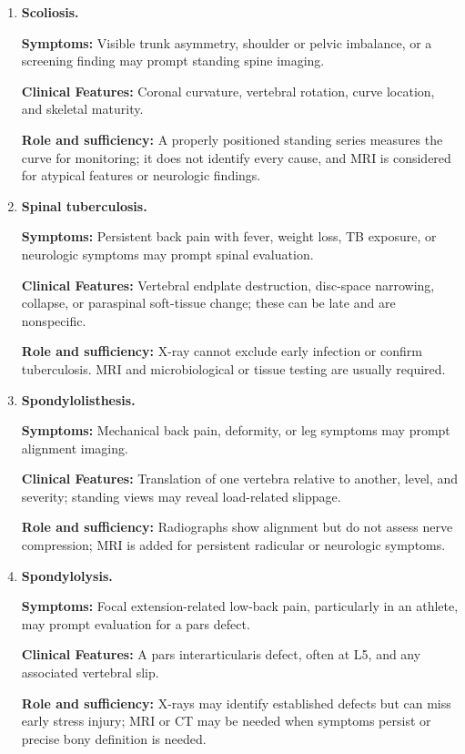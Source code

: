 \begin{enumerate}[leftmargin=*,itemsep=0.45em,topsep=0.4em]
\item \textbf{Scoliosis.}\par\noindent\textbf{Symptoms:} Visible trunk asymmetry, shoulder or pelvic imbalance, or a screening finding may prompt standing spine imaging.\par\noindent\textbf{Clinical Features:} Coronal curvature, vertebral rotation, curve location, and skeletal maturity.\par\noindent\textbf{Role and sufficiency:} A properly positioned standing series measures the curve for monitoring; it does not identify every cause, and MRI is considered for atypical features or neurologic findings.
\item \textbf{Spinal tuberculosis.}\par\noindent\textbf{Symptoms:} Persistent back pain with fever, weight loss, TB exposure, or neurologic symptoms may prompt spinal evaluation.\par\noindent\textbf{Clinical Features:} Vertebral endplate destruction, disc-space narrowing, collapse, or paraspinal soft-tissue change; these can be late and are nonspecific.\par\noindent\textbf{Role and sufficiency:} X-ray cannot exclude early infection or confirm tuberculosis. MRI and microbiological or tissue testing are usually required.
\item \textbf{Spondylolisthesis.}\par\noindent\textbf{Symptoms:} Mechanical back pain, deformity, or leg symptoms may prompt alignment imaging.\par\noindent\textbf{Clinical Features:} Translation of one vertebra relative to another, level, and severity; standing views may reveal load-related slippage.\par\noindent\textbf{Role and sufficiency:} Radiographs show alignment but do not assess nerve compression; MRI is added for persistent radicular or neurologic symptoms.
\item \textbf{Spondylolysis.}\par\noindent\textbf{Symptoms:} Focal extension-related low-back pain, particularly in an athlete, may prompt evaluation for a pars defect.\par\noindent\textbf{Clinical Features:} A pars interarticularis defect, often at L5, and any associated vertebral slip.\par\noindent\textbf{Role and sufficiency:} X-rays may identify established defects but can miss early stress injury; MRI or CT may be needed when symptoms persist or precise bony definition is needed.

\end{enumerate}
